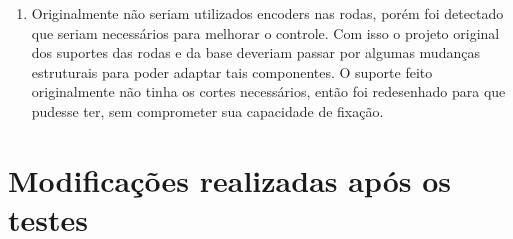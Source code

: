 \begin{itemize}
\begin{enumerate}
   			\item Originalmente não seriam utilizados encoders nas rodas, porém foi detectado que seriam necessários para melhorar o controle. Com isso o projeto original dos suportes das rodas e da base deveriam passar por algumas mudanças estruturais para poder adaptar tais componentes. O suporte feito originalmente não tinha os cortes necessários, então foi redesenhado para que pudesse ter, sem comprometer sua capacidade de fixação.


   		\end{enumerate}

   \end{itemize}
   

   \section{Modificações realizadas após os testes}
   \label{sub:mudanças}
